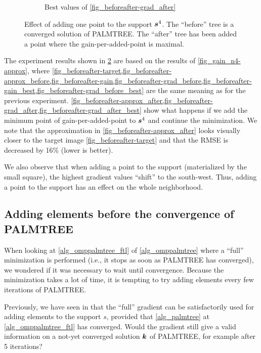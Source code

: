 \begin{figure}[!h]
\begin{subfigure}[b]{0.32\linewidth}
\caption{Best values of \ref{fig_beforeafter-grad_after}}\label{fig_beforeafter-grad_after_best}
\end{subfigure}
\caption{Effect of adding one point to the support $\bm{s}^4$. The “before” tree is a converged solution of \ac{PALMTREE}. The “after” tree has been added a point where the gain-per-added-point is maximal.}\label{fig_beforeafter}
\end{figure}

The experiment results shown in \cref{fig_beforeafter} are based on the results of \cref{fig_gain_n4-approx}, where \cref{fig_beforeafter-target,fig_beforeafter-approx_before,fig_beforeafter-gain,fig_beforeafter-grad_before,fig_beforeafter-gain_best,fig_beforeafter-grad_before_best} are the same meaning as for the previous experiment. 
\cref{fig_beforeafter-approx_after,fig_beforeafter-grad_after,fig_beforeafter-grad_after_best} show what  happens if we add the minimum point of gain-per-added-point to $\bm{s}^4$ and continue the minimization. We note that the approximation in \cref{fig_beforeafter-approx_after} looks visually closer to the target image \cref{fig_beforeafter-target} and that the RMSE is decreased by 16\% (lower is better).

\noindent
We also observe that when adding a point to the support (materialized by the  small square), the highest gradient values “shift” to the south-west. Thus, adding a point to the support has an effect on the whole neighborhood.

\FloatBarrier
\subsection{Adding elements before the convergence of \ac{PALMTREE}}\label{sec_add_before_converged}

When looking at \cref{alg_omppalmtree_ftl} of \cref{alg_omppalmtree} where a “full” minimization is performed (i.e., it stops as soon as \ac{PALMTREE} has converged), we wondered if it was necessary to wait until convergence. Because the minimization takes a lot of time, it is tempting to try adding elements every few iterations of \ac{PALMTREE}.

\noindent
Previously, we have seen in  that the “full” gradient can be satisfactorily used for adding elements to the support $s$, provided that \cref{alg_palmtree} at \cref{alg_omppalmtree_ftl} has converged. Would the gradient still give a valid information on a not-yet converged solution $\bm{k}$ of \ac{PALMTREE}, for example after 5 iterations?

